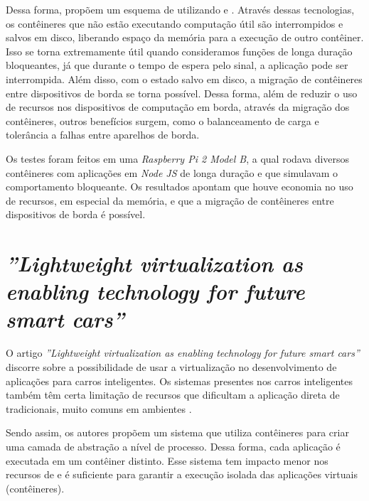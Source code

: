 Dessa forma,  propõem um esquema de \checkpointing utilizando \docker e \criu. Através dessas tecnologias, os contêineres que não estão executando computação útil são interrompidos e salvos em disco, liberando espaço da memória para a execução de outro contêiner. Isso se torna extremamente útil quando consideramos funções de longa duração bloqueantes, já que durante o tempo de espera pelo sinal, a aplicação pode ser interrompida. Além disso, com o estado salvo em disco, a migração de contêineres entre dispositivos \iot de borda se torna possível. Dessa forma, além de reduzir o uso de recursos nos dispositivos de computação em borda, através da migração dos contêineres, outros benefícios surgem, como o balanceamento de carga e tolerância a falhas entre aparelhos \iot de borda.

Os testes foram feitos em uma \textit{Raspberry Pi 2 Model B}, a qual rodava diversos contêineres com aplicações em \textit{Node JS} de longa duração e que simulavam o comportamento bloqueante. Os resultados apontam que houve economia no uso de recursos, em especial da memória, e que a migração de contêineres entre dispositivos \iot de borda é possível.

\section{ \textit{''Lightweight virtualization as enabling technology for future smart cars''}}

O artigo \textit{''Lightweight virtualization as enabling technology for future smart cars''} \cite{smartcarslwvirtualization} discorre sobre a possibilidade de usar a virtualização no desenvolvimento de aplicações para carros inteligentes. Os sistemas presentes nos carros inteligentes também têm certa limitação de recursos que dificultam a aplicação direta de \hypervisors tradicionais, muito comuns em ambientes \cloud.

Sendo assim, os autores propõem um sistema que utiliza contêineres \docker para criar uma camada de abstração a nível de processo. Dessa forma, cada aplicação é executada em um contêiner distinto. Esse sistema tem impacto menor nos recursos de \hardware e é suficiente para garantir a execução isolada das aplicações virtuais (contêineres).

